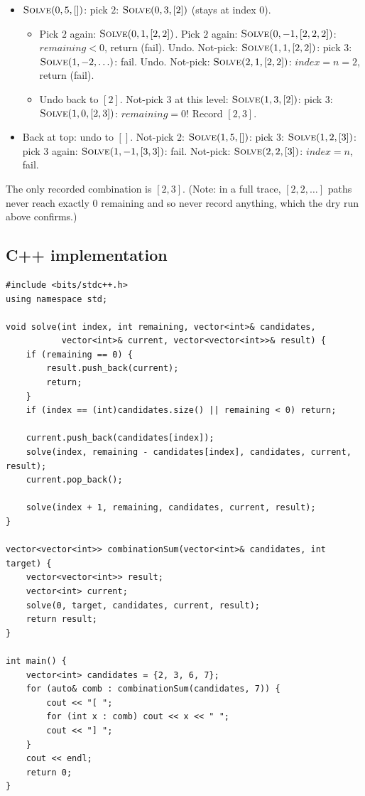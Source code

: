 
\begin{itemize}
  \item $\textsc{Solve}(0,5,[])$: pick $2$:
        $\textsc{Solve}(0,3,[2])$ (stays at index $0$).
  \begin{itemize}
    \item Pick $2$ again: $\textsc{Solve}(0,1,[2,2])$. Pick $2$ again:
          $\textsc{Solve}(0,-1,[2,2,2])$: $\textit{remaining}<0$,
          return (fail). Undo. Not-pick: $\textsc{Solve}(1,1,[2,2])$:
          pick $3$: $\textsc{Solve}(1,-2,\ldots)$: fail. Undo.
          Not-pick: $\textsc{Solve}(2,1,[2,2])$: $\textit{index}=n=2$,
          return (fail).
    \item Undo back to $[2]$. Not-pick $3$ at this level:
          $\textsc{Solve}(1,3,[2])$: pick $3$:
          $\textsc{Solve}(1,0,[2,3])$: $\textit{remaining}=0$! Record
          $[2,3]$.
  \end{itemize}
  \item Back at top: undo to $[]$. Not-pick $2$:
        $\textsc{Solve}(1,5,[])$: pick $3$: $\textsc{Solve}(1,2,[3])$:
        pick $3$ again: $\textsc{Solve}(1,-1,[3,3])$: fail. Not-pick:
        $\textsc{Solve}(2,2,[3])$: $\textit{index}=n$, fail.
\end{itemize}

The only recorded combination is $[2,3]$. (Note: in a full trace,
$[2,2,\ldots]$ paths never reach exactly $0$ remaining and so never
record anything, which the dry run above confirms.)

\subsection*{C++ implementation}

\begin{lstlisting}
#include <bits/stdc++.h>
using namespace std;

void solve(int index, int remaining, vector<int>& candidates,
           vector<int>& current, vector<vector<int>>& result) {
    if (remaining == 0) {
        result.push_back(current);
        return;
    }
    if (index == (int)candidates.size() || remaining < 0) return;

    current.push_back(candidates[index]);
    solve(index, remaining - candidates[index], candidates, current, result);
    current.pop_back();

    solve(index + 1, remaining, candidates, current, result);
}

vector<vector<int>> combinationSum(vector<int>& candidates, int target) {
    vector<vector<int>> result;
    vector<int> current;
    solve(0, target, candidates, current, result);
    return result;
}

int main() {
    vector<int> candidates = {2, 3, 6, 7};
    for (auto& comb : combinationSum(candidates, 7)) {
        cout << "[ ";
        for (int x : comb) cout << x << " ";
        cout << "] ";
    }
    cout << endl;
    return 0;
}
\end{lstlisting}

